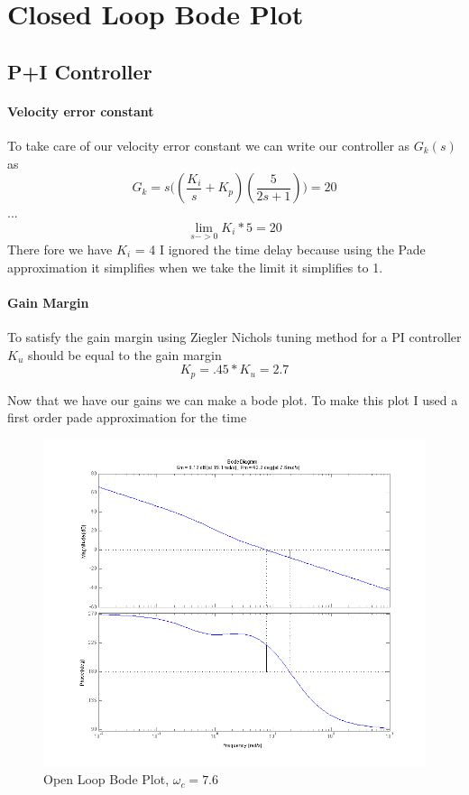 \documentclass[english]{article}
\begin{document}
\section*{Closed Loop Bode Plot}
\subsection*{P+I Controller} 
\paragraph*{Velocity error constant}
To take care of our velocity error constant  we can write  our controller  as $G_k(s)$ as 
$$ G_k = s \big( (\frac{K_i}{s} + K_p )(\frac{5}{2s + 1})\big) = 20 
$$
... 
$$
\lim_{s->0} K_i *5 = 20  
$$
There fore we have $K_i$ = 4 
I ignored the time delay because using the Pade approximation it simplifies when we take the limit it simplifies to 1. 
\paragraph*{Gain Margin}
 To satisfy the gain margin using Ziegler Nichols tuning method for a PI controller  $K_u$ should be equal to the gain margin 
 $$ K_p = .45 *K_u  = 2.7 
 $$

Now that we have our gains we can make a bode plot. 
To make this plot I used a first order pade approximation for the time 
\begin{figure}[!ht]
\includegraphics[width = \linewidth]{2a.png}
\caption{Open Loop Bode Plot, $\omega_c = 7.6$}
\end{figure}
\FloatBarrier 
\end{document}
